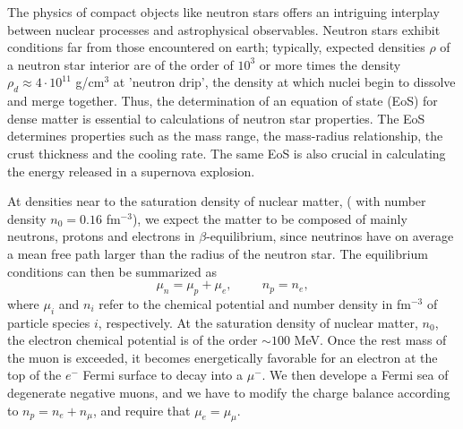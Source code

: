 \begin{multicols}{2}

The physics of compact objects like neutron stars offers
an intriguing interplay between nuclear processes  and
astrophysical observables.
Neutron stars exhibit conditions far from those 
encountered on earth; typically, expected densities $\rho$ 
of a neutron star interior are of the
order of $10^3$ or more times the density  
$\rho_d\approx 4\cdot 10^{11}$ g/cm$^{3}$ at 'neutron drip',
the density at which nuclei begin to 
dissolve and merge together.
Thus, the determination of an equation of state (EoS) 
for dense matter is essential to calculations of neutron 
star properties. The EoS determines properties  such as 
the mass range, the mass-radius relationship, the crust 
thickness and the cooling rate.
The same EoS is also crucial
in calculating the energy released in a supernova explosion.

At densities near to the saturation density of nuclear 
matter, ( with number density $n_0=0.16$ fm$^{-3}$),  
we expect the matter to be composed of mainly neutrons, protons  
and electrons in $\beta$-equilibrium, since neutrinos have on average a
mean free path larger than the radius of the neutron star. The 
equilibrium conditions can then be summarized as
\begin{equation}
    \mu_n=\mu_p+\mu_e,  \hspace{1cm} n_p = n_e,
     \label{eq:npebetaequilibrium}
\end{equation}
where $\mu_i$ and $n_i$ refer to the chemical potential and number density
in fm$^{-3}$ of particle species $i$, respectively. 
At the saturation density of nuclear matter, $n_0$, 
the electron chemical potential is
of the order $\sim 100$ MeV.
Once the rest mass of the muon is exceeded, it becomes
energetically favorable for an electron at the top
of the $e^-$ Fermi surface to decay into a
$\mu^-$. We then develope a Fermi sea of degenerate negative muons,
and we have to modify the charge balance according to $n_p = n_e+n_{\mu}$,
and require that $\mu_e = \mu_{\mu}$.


\end{multicols}
